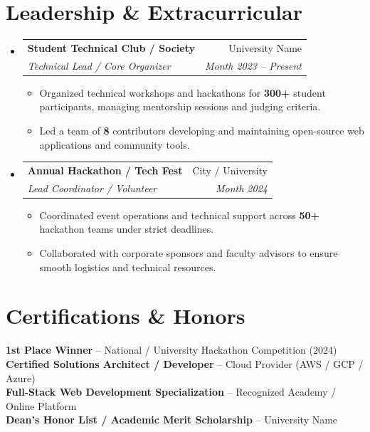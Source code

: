 \documentclass[letterpaper,10pt]{article}
\makeatletter
\newcommand{\resumeItem}[1]{
  \item\small{#1\vspace{-2pt}}
}
\newcommand{\resumeSubheading}[4]{
  \vspace{-2pt}\item
    \begin{tabular*}{0.97\textwidth}[t]{l@{\extracolsep{\fill}}r}
      \textbf{#1} & \small #2 \\
      \textit{\small#3} & \textit{\small #4} \\
    \end{tabular*}\vspace{-7pt}
}
\newcommand{\resumeSubHeadingListStart}{\begin{itemize}[leftmargin=0.15in, label={}]}
\newcommand{\resumeSubHeadingListEnd}{\end{itemize}}
\newcommand{\resumeItemListStart}{\begin{itemize}[leftmargin=0.3in]}
\newcommand{\resumeItemListEnd}{\end{itemize}\vspace{-5pt}}
\makeatother
\begin{document}
\vspace{-12pt}

\section{Leadership \& Extracurricular}
\resumeSubHeadingListStart

  \resumeSubheading
    {Student Technical Club / Society}{University Name}
    {Technical Lead / Core Organizer}{Month 2023 -- Present}
  \resumeItemListStart
    \resumeItem{Organized technical workshops and hackathons for \textbf{300+} student participants, managing mentorship sessions and judging criteria.}
    \resumeItem{Led a team of \textbf{8} contributors developing and maintaining open-source web applications and community tools.}
  \resumeItemListEnd

  \resumeSubheading
    {Annual Hackathon / Tech Fest}{City / University}
    {Lead Coordinator / Volunteer}{Month 2024}
  \resumeItemListStart
    \resumeItem{Coordinated event operations and technical support across \textbf{50+} hackathon teams under strict deadlines.}
    \resumeItem{Collaborated with corporate sponsors and faculty advisors to ensure smooth logistics and technical resources.}
  \resumeItemListEnd

\resumeSubHeadingListEnd

\vspace{-12pt}

\section{Certifications \& Honors}
\begin{itemize}[leftmargin=0.15in, label={}]
  \small{\item{
    \textbf{1st Place Winner} -- National / University Hackathon Competition (2024) \\
    \textbf{Certified Solutions Architect / Developer} -- Cloud Provider (AWS / GCP / Azure) \\
    \textbf{Full-Stack Web Development Specialization} -- Recognized Academy / Online Platform \\
    \textbf{Dean's Honor List / Academic Merit Scholarship} -- University Name
  }}
\end{itemize}
\end{document}

